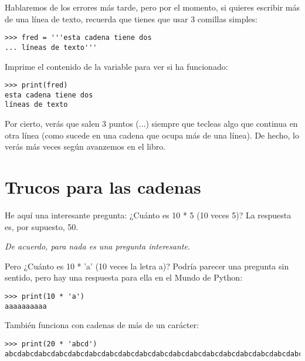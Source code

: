Hablaremos de los errores más tarde, pero por el momento, si quieres escribir más de una línea de texto, recuerda que tienes que usar 3 comillas simples:

\begin{listing}
\begin{verbatim}
>>> fred = '''esta cadena tiene dos
... líneas de texto'''
\end{verbatim}
\end{listing}

\noindent
Imprime el contenido de la variable para ver si ha funcionado:

\begin{listing}
\begin{verbatim}
>>> print(fred)
esta cadena tiene dos
líneas de texto
\end{verbatim}
\end{listing}

Por cierto, verás que salen 3 puntos (...) siempre que tecleas algo que continua en otra línea (como sucede en una cadena que ocupa más de una línea). De hecho, lo verás más veces según avanzemos en el libro.

\section{Trucos para las cadenas}\label{trickswithstrings}

He aquí una interesante pregunta: ¿Cuánto es 10 * 5 (10 veces 5)? La respuesta es, por supuesto, 50.

\noindent
\emph{De acuerdo, para nada es una pregunta interesante.}

Pero ¿Cuánto es 10 * 'a' (10 veces la letra a)? Podría parecer una pregunta sin sentido, pero hay una respuesta para ella en el Mundo de Python:

\begin{listing}
\begin{verbatim}
>>> print(10 * 'a')
aaaaaaaaaa
\end{verbatim}
\end{listing}

También funciona con cadenas de más de un carácter:

\begin{listing}
\begin{verbatim}
>>> print(20 * 'abcd')
abcdabcdabcdabcdabcdabcdabcdabcdabcdabcdabcdabcdabcdabcdabcdabcdabcdabcdabcdabcd
\end{verbatim}
\end{listing}

